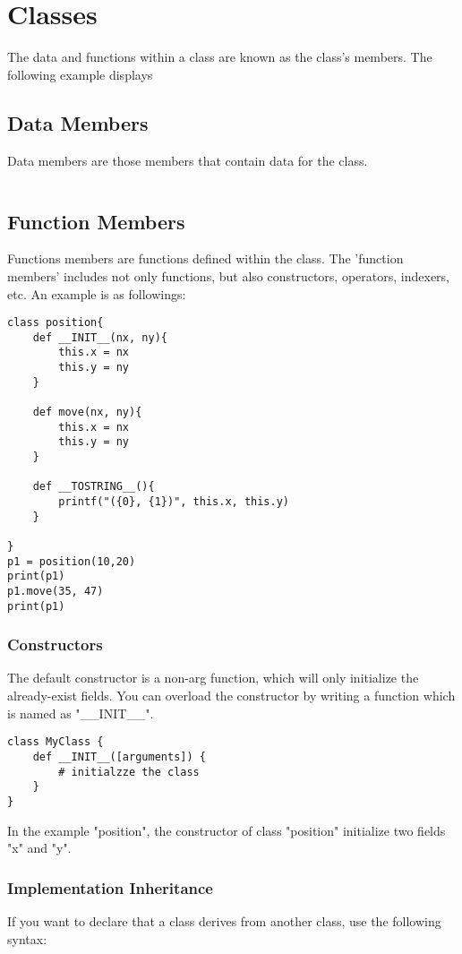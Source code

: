 \chapter{Classes}
The data and functions within a class are known as the class's members.
The following example displays
\section{Data Members}
Data members are those members that contain data for the class.
\begin{lstlisting}
\end{lstlisting}

\section{Function Members}
Functions members are functions defined within the class. The 'function members' includes not only functions, but also constructors, operators, indexers, etc. An example is as followings:
\begin{lstlisting}
class position{
	def __INIT__(nx, ny){
		this.x = nx
		this.y = ny
	}

	def move(nx, ny){
		this.x = nx
		this.y = ny
	}

	def __TOSTRING__(){
		printf("({0}, {1})", this.x, this.y)
	}

}
p1 = position(10,20)
print(p1)
p1.move(35, 47)
print(p1)
\end{lstlisting}	


\subsection{Constructors}
The default constructor is a non-arg function, which will only initialize the already-exist fields. You can overload the constructor by writing a function which is named as "\_\_INIT\_\_".

\begin{lstlisting}
class MyClass {
	def __INIT__([arguments]) {
		# initialzze the class
	}
}
\end{lstlisting}

In the example "position", the constructor of class "position" initialize two fields "x" and "y".

\subsection{Implementation Inheritance}
If you want to declare that a class derives from another class, use the following syntax:

